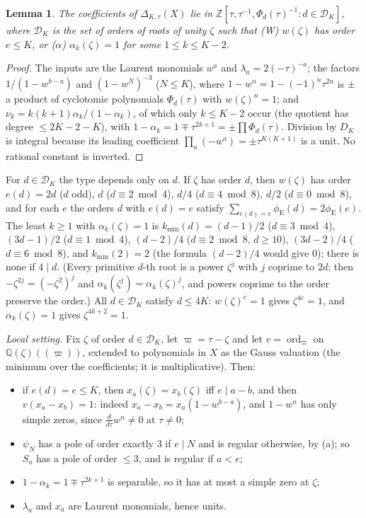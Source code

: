 \documentclass[11pt]{amsart}
\newtheorem{lemma}[theorem]{Lemma}
\theoremstyle{definition}
\theoremstyle{remark}
\numberwithin{equation}{section}
\newcommand{\ZZ}{\mathbb{Z}}
\newcommand{\QQ}{\mathbb{Q}}
\newcommand{\cD}{\mathcal{D}}
\newcommand{\eu}{\phi_{\mathrm E}}
\begin{document}
\begin{lemma}\label{lem:ring}
The coefficients of $\Delta_{K,\tau}(X)$ lie in $\ZZ[\tau,\tau^{-1},\Phi_d(\tau)^{-1}:d\in\cD_K]$, where $\cD_K$ is
the set of orders of roots of unity $\zeta$ such that
\textup{(W)} $w(\zeta)$ has order $e\le K$, or \textup{($\alpha$)} $\alpha_k(\zeta)=1$ for some $1\le k\le K-2$.
\end{lemma}
\begin{proof}
The inputs are the Laurent monomials $w^a$ and $\lambda_a=2(-\tau)^{-a}$; the factors $1/(1-w^{b-a})$ and
$(1-w^N)^{-3}$ ($N\le K$), where $1-w^n=1-(-1)^n\tau^{2n}$ is $\pm$ a product of cyclotomic polynomials $\Phi_d(\tau)$
with $w(\zeta)^n=1$; and $\nu_k=k(k+1)\alpha_k/(1-\alpha_k)$, of which only $k\le K-2$ occur (the quotient has degree
$\le 2K-2-K$), with $1-\alpha_k=1\mp\tau^{2k+1}=\pm\prod\Phi_d(\tau)$. Division by $D_K$ is integral because its leading
coefficient $\prod_a(-w^a)=\pm\tau^{K(K+1)}$ is a unit. No rational constant is inverted.
\end{proof}

For $d\in\cD_K$ the type depends only on $d$. If $\zeta$ has order $d$, then $w(\zeta)$ has order $e(d)=2d$ ($d$ odd),
$d$ ($d\equiv2\bmod4$), $d/4$ ($d\equiv4\bmod8$), $d/2$ ($d\equiv0\bmod8$), and for each $e$ the orders $d$ with
$e(d)=e$ satisfy $\sum_{e(d)=e}\eu(d)=2\eu(e)$. The least $k\ge1$ with $\alpha_k(\zeta)=1$ is
$k_{\min}(d)=(d-1)/2$ ($d\equiv3\bmod4$), $(3d-1)/2$ ($d\equiv1\bmod4$), $(d-2)/4$ ($d\equiv2\bmod8$, $d\ge10$),
$(3d-2)/4$ ($d\equiv6\bmod8$), and $k_{\min}(2)=2$ (the formula $(d-2)/4$ would give $0$); there is none if $4\mid d$.
(Every primitive $d$-th root is a power $\zeta^j$ with $j$ coprime to $2d$; then $-\zeta^{2j}=(-\zeta^2)^j$ and
$\alpha_k(\zeta^j)=\alpha_k(\zeta)^j$, and powers coprime to the order preserve the order.) All $d\in\cD_K$ satisfy
$d\le4K$: $w(\zeta)^e=1$ gives $\zeta^{4e}=1$, and $\alpha_k(\zeta)=1$ gives $\zeta^{4k+2}=1$.

\emph{Local setting.} Fix $\zeta$ of order $d\in\cD_K$, let $\varpi=\tau-\zeta$ and let $v=\operatorname{ord}_\varpi$ on
$\QQ(\zeta)((\varpi))$, extended to polynomials in $X$ as the Gauss valuation (the minimum over the coefficients; it is
multiplicative). Then:
\begin{itemize}
\item[(a)] if $e(d)=e\le K$, then $x_a(\zeta)=x_b(\zeta)$ iff $e\mid a-b$, and then $v(x_a-x_b)=1$: indeed
$x_a-x_b=x_a(1-w^{b-a})$, and $1-w^n$ has only simple zeros, since $\frac{d}{d\tau}w^n\ne0$ at $\tau\ne0$;
\item[(b)] $\psi_N$ has a pole of order exactly $3$ if $e\mid N$ and is regular otherwise, by (a); so $S_a$ has a pole of
order $\le3$, and is regular if $a<e$;
\item[(c)] $1-\alpha_k=1\mp\tau^{2k+1}$ is separable, so it has at most a simple zero at $\zeta$;
\item[(d)] $\lambda_a$ and $x_a$ are Laurent monomials, hence units.
\end{itemize}
\end{document}
